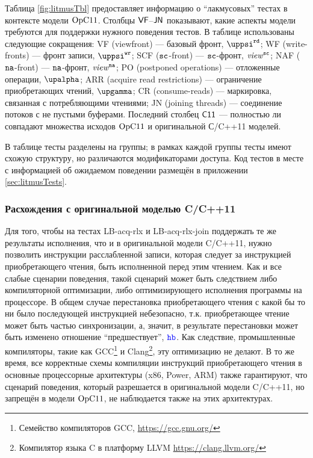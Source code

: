 Таблица \ref{fig:litmusTbl} предоставляет информацию о ``лакмусовых'' тестах в контексте модели $\mathrm{OpC11}$.
Столбцы ${\sf VF}$--${\sf JN}$ показывают, какие аспекты модели требуются для поддержки нужного поведения тестов.
В таблице использованы следующие сокращения:
  \textsf{VF} (viewfront) --- базовый фронт, $\stPsiRead$;
  \textsf{WF} (write-fronts) --- фронт записи, $\stPsiWrite$;
  \textsf{SCF} (${\mathtt{sc}}$-front) --- ${\mathtt{sc}}$-фронт, $\mathit{view}^{\text{\scriptsize{\texttt{sc}}}}$;
  \textsf{NAF} ($\mathtt{na}$-front) --- $\mathtt{na}$-фронт, $\mathit{view}^{\text{\scriptsize{\texttt{na}}}}$;
  \textsf{PO} (postponed operations) --- отложенные операции, $\stAlpha$;
  \textsf{ARR} (acquire read restrictions) --- ограничение приобретающих чтений, $\stGamma$;
  \textsf{CR} (consume-reads) --- маркировка, связанная с потребляющими чтениями;
  \textsf{JN} (joining threads) --- соединение потоков с не пустыми буферами.
Последний столбец ${\sf C11}$ --- полностью ли совпадают множества исходов $\mathrm{OpC11}$ и оригинальной С/C++11 моделей.

В таблице тесты разделены на группы; в рамках каждой группы тесты имеют схожую структуру, но различаются модификаторами
доступа.
Код тестов в месте с информацией об ожидаемом поведении размещён в приложении \ref{sec:litmusTests}.

\subsubsection{Расхождения с оригинальной моделью C/C++11}
Для того, чтобы на тестах \textsf{LB-acq-rlx} и \textsf{LB-acq-rlx-join} поддержать те же результаты исполнения,
что и в оригинальной модели C/C++11, нужно позволить инструкции расслабленной записи, которая следует за
инструкцией приобретающего чтения, быть исполненной перед этим чтением.
Как и все слабые сценарии поведения, такой сценарий может быть следствием либо компиляторной оптимизации,
либо оптимизирующего исполнения программы на процессоре.
В общем случае перестановка приобретающего чтения с какой бы то ни было последующей инструкцией небезопасно,
т.к. приобретающее чтение может быть частью синхронизации, а, значит, в результате перестановки может быть
изменено отношение ``предшествует'', $\lHB$. Как следствие, промышленные компиляторы, такие как
GCC\footnote{Семейство компиляторов GCC, \url{https://gcc.gnu.org/}} и
Clang\footnote{Компилятор языка C в платформу LLVM \url{https://clang.llvm.org/}}, эту оптимизацию не делают.
В то же время, все корректные схемы компиляции инструкций приобретающего чтения в основные процессорные архитектуры (x86, Power, ARM)
также гарантируют, что сценарий поведения, который разрешается в оригинальной модели C/C++11, но запрещён в модели $\mathrm{OpC11}$,
не наблюдается также на этих архитектурах.

